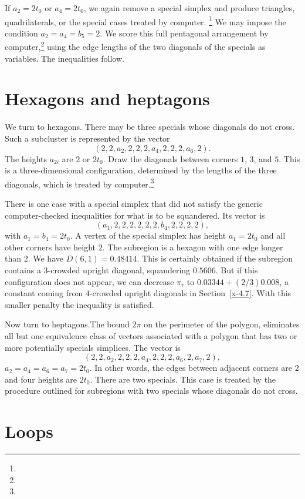 If $a_2=2t_0$ or $a_4=2t_0$, we again remove a special simplex and
produce triangles, quadrilaterals, or the special cases treated
by computer.%
\footnote{} %
We may impose the condition $a_2=a_4=b_5=2$. We score this full pentagonal
arrangement by computer,\footnote{} %
using the edge lengths of the two diagonals of
the specials as variables. The inequalities follow.

\section{Hexagons and heptagons}

We turn to hexagons. There may be three specials whose diagonals do not
cross.  Such a subcluster is represented by the vector
    $$(2,2,a_2,2,2,2,a_4,2,2,2,a_6,2).$$
The heights $a_{2i}$ are $2$ or $2t_0$.  Draw the diagonals between
corners $1$, $3$, and $5$.  This is a three-dimensional configuration,
determined by the lengths of the three diagonals, which is treated
by computer.\footnote{} %

There is one case with a special simplex that
did not satisfy the generic computer-checked inequalities for
what is to be squandered.  Its vector is
    $$(a_1,2,2,2,2,2,2,b_4,2,2,2,2),$$
with $a_1=b_4=2t_0$. A vertex of the special simplex has height
$a_1=2t_0$ and all other corners have height $2$.  The subregion
is a hexagon with one edge longer than $2$.  We have $D(6,1)=
0.48414$. This is certainly obtained if the subregion contains a
$3$-crowded upright diagonal, squandering $0.5606$. But if this
configuration does not appear, we can decrease $\pi_\tau$ to
    $0.03344 + (2/3) 0.008$,
a constant coming from $4$-crowded upright diagonals in
Section~\ref{x-4.7}. With this smaller penalty the inequality is
satisfied.

Now turn to heptagons.The bound $2\pi$  on the perimeter of the polygon,
eliminates all but one equivalence class of vectors associated with a
polygon that has two or more potentially specials simplices. The vector
is
    $$(2,2,a_2,2,2,2,a_4,2,2,2,a_6,2,a_7,2),$$
$a_2=a_4=a_6=a_7=2t_0$. In other words, the edges between adjacent
corners are $2$ and four heights are $2t_0$. There are two specials.
This case is treated by the procedure outlined for subregions with two
specials whose diagonals do not cross.

\section{Loops}
    \label{sec:loops}

